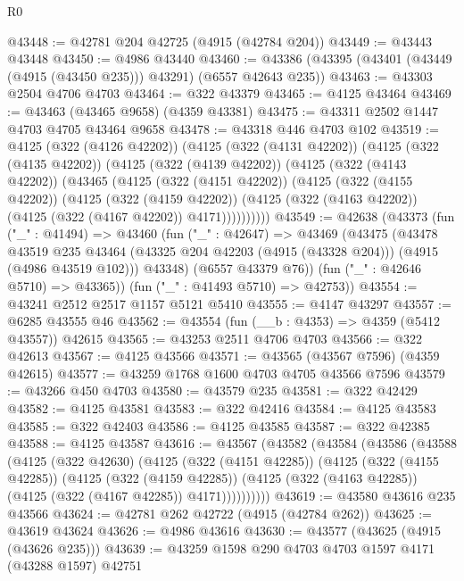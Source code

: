 \begin{lexlean}{R0}
\begin{coremodule}
@43448 := @42781 @204 @42725 (@4915 (@42784 @204))
@43449 := @43443 @43448
@43450 := @4986 @43440
@43460 := @43386 (@43395 (@43401 (@43449 (@4915 (@43450 @235))) @43291) (@6557 @42643 @235))
@43463 := @43303 @2504 @4706 @4703
@43464 := @322 @43379
@43465 := @4125 @43464
@43469 := @43463 (@43465 @9658) (@4359 @43381)
@43475 := @43311 @2502 @1447 @4703 @4705 @43464 @9658
@43478 := @43318 @446 @4703 @102
@43519 := @4125
    (@322 (@4126 @42202))
    (@4125
      (@322 (@4131 @42202))
      (@4125
        (@322 (@4135 @42202))
        (@4125
          (@322 (@4139 @42202))
          (@4125
            (@322 (@4143 @42202))
            (@43465
              (@4125
                (@322 (@4151 @42202))
                (@4125
                  (@322 (@4155 @42202))
                  (@4125
                    (@322 (@4159 @42202))
                    (@4125 (@322 (@4163 @42202)) (@4125 (@322 (@4167 @42202)) @4171))))))))))
@43549 := @42638
    (@43373
      (fun ("_" : @41494) =>
      @43460
        (fun ("_" : @42647) =>
        @43469
          (@43475
            (@43478
              @43519
              @235
              @43464
              (@43325 @204 @42203 (@4915 (@43328 @204)))
              (@4915 (@4986 @43519 @102)))
            @43348)
          (@6557 @43379 @76))
        (fun ("_" : @42646 @5710) => @43365))
      (fun ("_" : @41493 @5710) => @42753))
@43554 := @43241 @2512 @2517 @1157 @5121 @5410
@43555 := @4147 @43297
@43557 := @6285 @43555 @46
@43562 := @43554 (fun (__b : @4353) => @4359 (@5412 @43557)) @42615
@43565 := @43253 @2511 @4706 @4703
@43566 := @322 @42613
@43567 := @4125 @43566
@43571 := @43565 (@43567 @7596) (@4359 @42615)
@43577 := @43259 @1768 @1600 @4703 @4705 @43566 @7596
@43579 := @43266 @450 @4703
@43580 := @43579 @235
@43581 := @322 @42429
@43582 := @4125 @43581
@43583 := @322 @42416
@43584 := @4125 @43583
@43585 := @322 @42403
@43586 := @4125 @43585
@43587 := @322 @42385
@43588 := @4125 @43587
@43616 := @43567
    (@43582
      (@43584
        (@43586
          (@43588
            (@4125
              (@322 @42630)
              (@4125
                (@322 (@4151 @42285))
                (@4125
                  (@322 (@4155 @42285))
                  (@4125
                    (@322 (@4159 @42285))
                    (@4125 (@322 (@4163 @42285)) (@4125 (@322 (@4167 @42285)) @4171))))))))))
@43619 := @43580 @43616 @235 @43566
@43624 := @42781 @262 @42722 (@4915 (@42784 @262))
@43625 := @43619 @43624
@43626 := @4986 @43616
@43630 := @43577 (@43625 (@4915 (@43626 @235)))
@43639 := @43259 @1598 @290 @4703 @4703 @1597 @4171 (@43288 @1597) @42751

\end{coremodule}
\end{lexlean}
